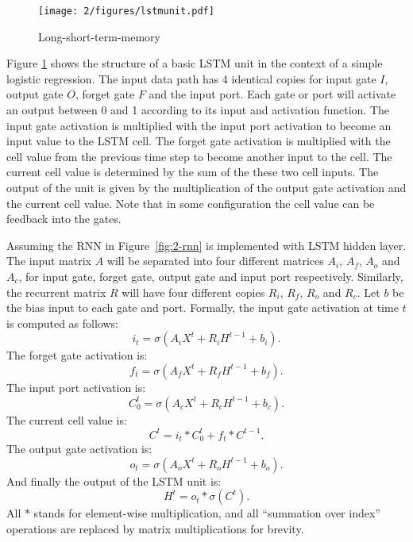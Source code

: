 \begin{figure}[htb]
\centering
\texttt{[image: 2/figures/lstmunit.pdf]}
\caption{Long-short-term-memory}
\label{fig:2-lstmunit}
\end{figure}
Figure \ref{fig:2-lstmunit} shows the structure of a basic LSTM unit \cite{graves2012supervised} in the context of a simple logistic regression. The input data path has 4 identical copies for input gate $I$, output gate $O$, forget gate $F$ and the input port. Each gate or port will activate an output between 0 and 1 according to its input and activation function. The input gate activation is multiplied with the input port activation to become an input value to the LSTM cell. The forget gate activation is multiplied with the cell value from the previous time step to become another input to the cell. The current cell value is determined by the sum of the these two cell inputs. The output of the unit is given by the multiplication of the output gate activation and the current cell value. Note that in some configuration the cell value can be feedback into the gates.

Assuming the RNN in Figure~\ref{fig:2-rnn} is implemented with LSTM hidden layer. The input matrix $A$ will be separated into four different matrices $A_i$, $A_f$, $A_o$ and $A_c$, for input gate, forget gate, output gate and input port respectively. Similarly, the recurrent matrix $R$ will have four different copies $R_i$, $R_f$, $R_o$ and $R_c$. Let $b$ be the bias input to each gate and port. Formally, the input gate activation at time $t$ is computed as follows:
\begin{equation}
i_t = \sigma(A_iX^t + R_iH^{t-1}+b_i).
\end{equation}
The forget gate activation is:
\begin{equation}
f_t = \sigma(A_fX^t + R_fH^{t-1}+b_f).
\end{equation}
The input port activation is:
\begin{equation}
C^t_0 = \sigma(A_cX^t + R_cH^{t-1}+b_c).
\end{equation}
The current cell value is:
\begin{equation}
C^t = i_t*C^t_0 + f_t*C^{t-1}.
\end{equation}
The output gate activation is:
\begin{equation}
o_t = \sigma(A_oX^t + R_oH^{t-1}+b_o).
\end{equation}
And finally the output of the LSTM unit is:
\begin{equation}
H^t = o_t*\sigma(C^t).
\end{equation}
All $*$ stands for element-wise multiplication, and all ``summation over index'' operations are replaced by matrix multiplications for brevity. 

